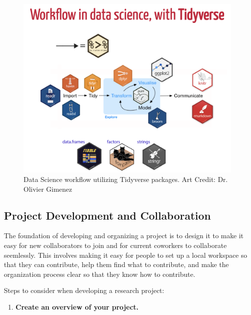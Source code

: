 \documentclass[
]{book}
\providecommand{\tightlist}{%
  \setlength{\itemsep}{0pt}\setlength{\parskip}{0pt}}
\begin{document}
\begin{figure}

{\centering \includegraphics[width=1\linewidth]{images/tidyverse} 

}

\caption{Data Science workflow utilizing Tidyverse packages. Art Credit: Dr. Olivier Gimenez}\label{fig:tidyverse}
\end{figure}

\hypertarget{project-development-and-collaboration}{%
\subsection{Project Development and Collaboration}\label{project-development-and-collaboration}}

The foundation of developing and organizing a project is to design it to make it easy for new collaborators to join and for current coworkers to collaborate seemlessly. This involves making it easy for people to set up a local workspace so that they can contribute, help them find what to contribute, and make the organization process clear so that they know how to contribute.

Steps to consider when developing a research project:

\begin{enumerate}
\def\labelenumi{\arabic{enumi}.}
\tightlist
\item
  \textbf{Create an overview of your project.}
\end{enumerate}
\end{document}
